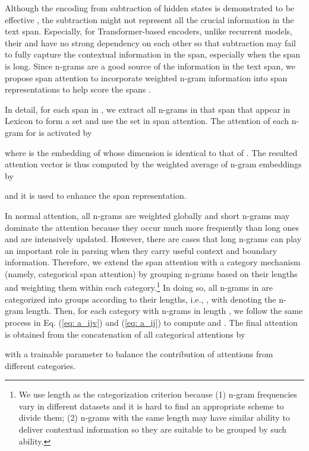 \documentclass[11pt,a4paper]{article}
\begin{document}
Although the encoding from subtraction of hidden states is demonstrated to be effective \cite{stern-etal-2017-minimal,kitaev-klein-2018-constituency,kitaev-etal-2019-multilingual}, 
the subtraction might not represent all the crucial information in the text span.
Especially, for Transformer-based encoders, unlike recurrent models, their  and  have no strong dependency on each other so that subtraction may fail to fully capture the contextual information in the span, especially when the span is long.
Since n-grams are a good source of the information in the text span, we propose span attention to incorporate weighted n-gram information into span representations to help score the spans .


 

In detail, for each span  in , we extract all n-grams in that span that appear in Lexicon  to form a set  and use the set in span attention.
The attention of each n-gram  for  is activated by

where  is the embedding of  whose dimension is identical to that of .
The resulted attention vector  is thus computed by the weighted average of n-gram embeddings by

and it is used to enhance the span representation.


In normal attention, all n-grams are weighted globally and short n-grams may dominate the attention because they occur much more frequently than long ones and are intensively updated.
However, there are cases that long n-grams can play an important role in parsing when they carry useful context and boundary information.
Therefore, we extend the span attention with a category mechanism (namely, categorical span attention) by grouping n-grams based on their lengths and weighting them within each category.\footnote{We use length as the categorization criterion because (1) n-gram frequencies vary in different datasets and it is hard to find an appropriate scheme to divide them;
(2) n-grams with the same length may have similar ability to deliver contextual information so they are suitable to be grouped by such ability.}
In doing so, all n-grams in  are categorized into  groups according to their lengths, i.e., , with  denoting the n-gram length.
Then, for each category with n-grams in length , we follow 
the same process in Eq. (\ref{eq: a_ijv}) and (\ref{eq: a_ij}) to compute  and .
The final attention is obtained from the concatenation of all categorical attentions by

with a trainable parameter  to balance the contribution of attentions from different categories.
\end{document}
